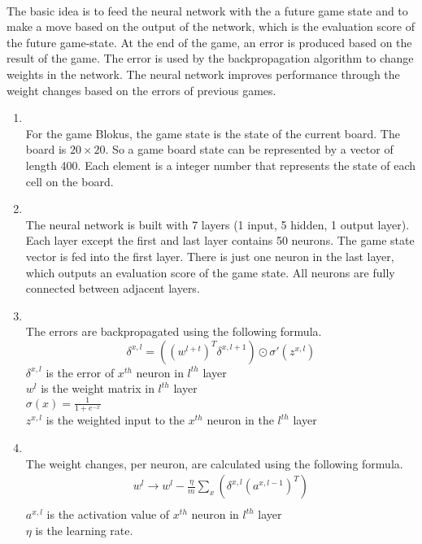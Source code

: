 \documentclass{report}
\begin{document}
	\\
		The basic idea is to feed the neural network with the a future game state and to make a move based on the output of the network, which is the evaluation score of the future game-state.
		At the end of the game, an error is produced based on the result of the game. The error is used by the backpropagation algorithm to change weights in the network. The neural network improves
		performance through the weight changes based on the errors of previous games.
		\begin{enumerate}
			\item {}\\
				For the game Blokus, the game state is the state of the current board. The board is $20\times20$. So a game board state can be represented by a vector of length 400.
				Each element is a integer number that represents the state of each cell on the board. 
			\item {}\\
				The neural network is built with 7 layers (1 input, 5 hidden, 1 output layer). Each layer except the first and last layer contains 50 neurons. The game state vector is fed into the first layer. There is just one
				neuron in the last layer, which outputs an evaluation score of the game state. All neurons are fully connected between adjacent layers. 
			\item {}\\
				The errors are backpropagated using the following formula.
					\begin{equation*}
					\delta^{x, l} = \left( \left( w^{l+t} \right)^T \delta^{x, l+1} \right) \odot  \sigma'\left( z^{x, l}\right)
					\end{equation*}
				$\delta^{x, l}$  is the error of $x^{th}$ neuron in $l^{th}$ layer\\
				$w^l$  is the weight matrix in $l^{th}$ layer \\
				$\sigma(x)=\frac{1}{1+e^{-x}}$ \\
				$z^{x, l}$ is the weighted input to the $x^{th}$ neuron in the $l^{th}$ layer
			\item {}\\
				The weight changes, per neuron, are calculated using the following formula.
					\begin{align*}
						w^l \rightarrow w^l - \frac{\eta}{m} \sum_{x} \left(\delta^{x, l} \left( a^{x, l-1}\right) ^T\right) \\
					\end{align*}
						$a^{x, l}$  is the activation value of $x^{th}$ neuron in $l^{th}$ layer \\
						$\eta$ is the learning rate.
		\end{enumerate}
\end{document}
